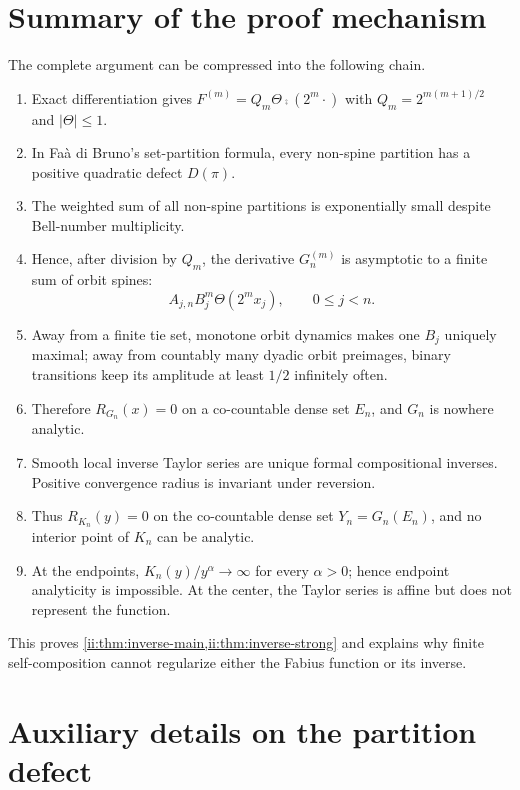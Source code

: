 \section{Summary of the proof mechanism}

The complete argument can be compressed into the following chain.
\begin{enumerate}[label=\arabic*.]
 \item Exact differentiation gives
 $F^{(m)}=Q_m\Theta\comp(2^m\cdot)$ with
 $Q_m=2^{m(m+1)/2}$ and $|\Theta|\leq1$.
 \item In Fa\`a di Bruno's set-partition formula, every non-spine partition has a
 positive quadratic defect $D(\pi)$.
 \item The weighted sum of all non-spine partitions is exponentially small despite
 Bell-number multiplicity.
 \item Hence, after division by $Q_m$, the derivative $G_n^{(m)}$ is asymptotic to a
 finite sum of orbit spines:
 \
 \[
   A_{j,n}B_j^m\Theta(2^m x_j),\qquad 0\leq j<n.
 \]
 \item Away from a finite tie set, monotone orbit dynamics makes one $B_j$ uniquely
 maximal; away from countably many dyadic orbit preimages, binary transitions keep its
 amplitude at least $1/2$ infinitely often.
 \item Therefore $R_{G_n}(x)=0$ on a co-countable dense set $E_n$, and $G_n$ is nowhere
 analytic.
 \item Smooth local inverse Taylor series are unique formal compositional inverses.
 Positive convergence radius is invariant under reversion.
 \item Thus $R_{K_n}(y)=0$ on the co-countable dense set $Y_n=G_n(E_n)$, and no interior
 point of $K_n$ can be analytic.
 \item At the endpoints, $K_n(y)/y^\alpha\to\infty$ for every $\alpha>0$; hence endpoint
 analyticity is impossible.  At the center, the Taylor series is affine but does not
 represent the function.
\end{enumerate}
This proves \cref{ii:thm:inverse-main,ii:thm:inverse-strong} and explains why finite
self-composition cannot regularize either the Fabius function or its inverse.

\appendix

\section{Auxiliary details on the partition defect}
\label{ii:app:defect}

